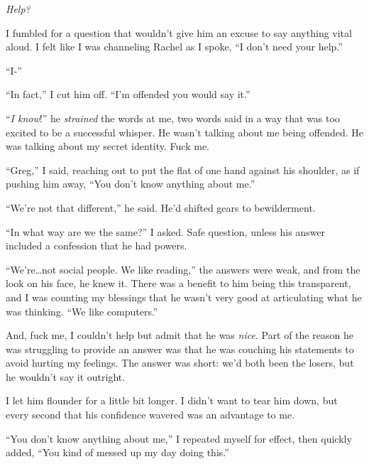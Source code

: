 \emph{Help?}



I fumbled for a question that wouldn't give him an excuse to say anything vital aloud.  I felt like I was channeling Rachel as I spoke, ``I don't need your help.''



``I-''



``In fact,'' I cut him off.  ``I'm offended you would say it.''



``\emph{I know}!'' he \emph{strained} the words at me, two words said in a way that was too excited to be a successful whisper.  He wasn't talking about me being offended.  He was talking about my secret identity.  Fuck me.



``Greg,'' I said, reaching out to put the flat of one hand against his shoulder, as if pushing him away, ``You don't know anything about me.''



``We're not that different,'' he said.  He'd shifted gears to bewilderment.



``In what way are we the same?'' I asked.  Safe question, unless his answer included a confession that he had powers.



``We're\ldots not social people.  We like reading,'' the answers were weak, and from the look on his face, he knew it.  There was a benefit to him being this transparent, and I was counting my blessings that he wasn't very good at articulating what he was thinking.  ``We like computers.''



And, fuck me, I couldn't help but admit that he was \emph{nice}.  Part of the reason he was struggling to provide an answer was that he was couching his statements to avoid hurting my feelings.  The answer was short: we'd both been the losers, but he wouldn't say it outright.



I let him flounder for a little bit longer.  I didn't want to tear him down, but every second that his confidence wavered was an advantage to me.



``You don't know anything about me,'' I repeated myself for effect, then quickly added, ``You kind of messed up my day doing this.''



